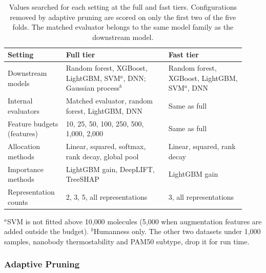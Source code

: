 \begin{table}[htbp]
\centering
\begin{adjustbox}{max width=\textwidth,max totalheight=0.78\textheight}
\begin{tabular}{@{}P{0.22\linewidth}P{0.40\linewidth}P{0.30\linewidth}@{}}
\toprule
Setting & Full tier & Fast tier \\
\midrule
Downstream models & Random forest, XGBoost, LightGBM, SVM$^{a}$, DNN; Gaussian process$^{b}$ & Random forest, XGBoost, LightGBM, SVM$^{a}$, DNN \\
Internal evaluators & Matched evaluator, random forest, LightGBM, DNN & Same as full \\
Feature budgets (features) & 10, 25, 50, 100, 250, 500, 1{,}000, 2{,}000 & Same as full \\
Allocation methods & Linear, squared, softmax, rank decay, global pool & Linear, squared, rank decay \\
Importance methods & LightGBM gain, DeepLIFT, TreeSHAP & LightGBM gain \\
Representation counts & 2, 3, 5, all representations & 3, all representations \\
\bottomrule
\end{tabular}
\end{adjustbox}

\smallskip
{\footnotesize $^{a}$SVM is not fitted above 10{,}000 molecules (5{,}000 when augmentation features are added outside the budget). $^{b}$Humanness only. The other two datasets under 1{,}000 samples, nanobody thermostability and PAM50 subtype, drop it for run time.}
\caption[Values searched for each setting at the two search tiers.]{Values searched for each setting at the full and fast tiers. Configurations removed by adaptive pruning are scored on only the first two of the five folds. The matched evaluator belongs to the same model family as the downstream model.}
\label{tab:search_tiers}
\end{table}

\subsubsection{Adaptive Pruning}


